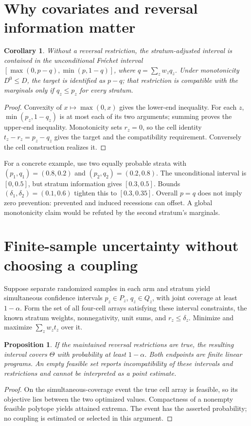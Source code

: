 \documentclass[11pt]{article}
\newtheorem{proposition}[theorem]{Proposition}
\newtheorem{corollary}[theorem]{Corollary}
\theoremstyle{definition}
\begin{document}
\section*{Why covariates and reversal information matter}
\begin{corollary}
Without a reversal restriction, the stratum-adjusted interval is contained
in the unconditional Fr\'echet interval
$[\max(0,p-q),\min(p,1-q)]$, where $q=\sum_z w_zq_z$.
Under monotonicity $D^0\le D$, the target is identified as $p-q$;
that restriction is compatible with the marginals only if $q_z\le p_z$
for every stratum.
\end{corollary}
\begin{proof}
Convexity of $x\mapsto\max(0,x)$ gives the lower-end inequality.
For each $z$, $\min(p_z,1-q_z)$ is at most each of its two arguments;
summing proves the upper-end inequality. Monotonicity sets $r_z=0$,
so the cell identity $t_z-r_z=p_z-q_z$ gives the target and the
compatibility requirement. Conversely the cell construction realizes it.
\end{proof}

For a concrete example, use two equally probable strata with
$(p_1,q_1)=(0.8,0.2)$ and $(p_2,q_2)=(0.2,0.8)$.
The unconditional interval is $[0,0.5]$, but stratum information gives
$[0.3,0.5]$. Bounds $(\delta_1,\delta_2)=(0.1,0.6)$ tighten this to
$[0.3,0.35]$. Overall $p=q$ does not imply zero prevention: prevented and
induced recessions can offset. A global monotonicity claim would be refuted
by the second stratum's marginals.

\section*{Finite-sample uncertainty without choosing a coupling}
Suppose separate randomized samples in each arm and stratum yield simultaneous
confidence intervals $p_z\in P_z$, $q_z\in Q_z$, with joint coverage at
least $1-\alpha$. Form the set of all four-cell arrays satisfying these
interval constraints, the known stratum weights, nonnegativity, unit sums,
and $r_z\le\delta_z$. Minimize and maximize $\sum_z w_zt_z$ over it.
\begin{proposition}
If the maintained reversal restrictions are true, the resulting interval
covers $\Theta$ with probability at least $1-\alpha$. Both endpoints are
finite linear programs. An empty feasible set reports incompatibility of
these intervals and restrictions and cannot be interpreted as a point estimate.
\end{proposition}
\begin{proof}
On the simultaneous-coverage event the true cell array is feasible, so its
objective lies between the two optimized values. Compactness of a nonempty
feasible polytope yields attained extrema. The event has the asserted
probability; no coupling is estimated or selected in this argument.
\end{proof}
\end{document}
